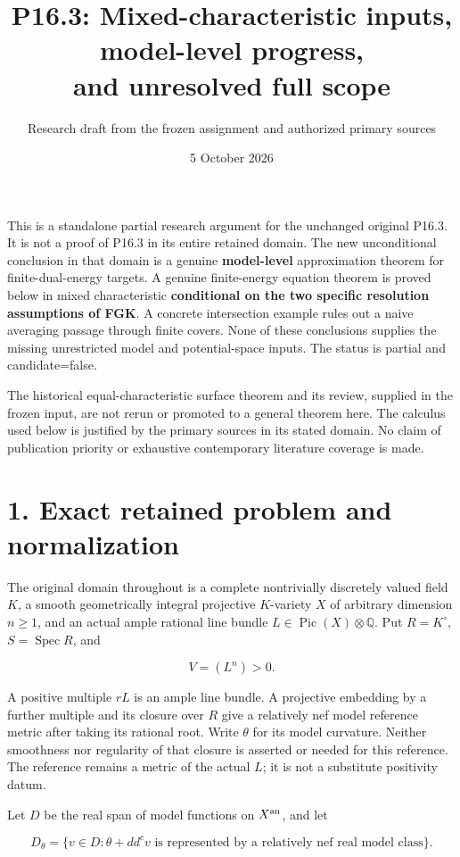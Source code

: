 \documentclass[11pt]{article}
\title{P16.3: Mixed-characteristic inputs, model-level progress,\\and unresolved full scope}
\author{Research draft from the frozen assignment and authorized primary sources}
\date{5 October 2026}
\begin{document}
\maketitle
This is a standalone partial research argument for the unchanged original P16.3. It is not a proof of P16.3 in its entire retained domain. The new unconditional conclusion in that domain is a genuine \textbf{model-level} approximation theorem for finite-dual-energy targets. A genuine finite-energy equation theorem is proved below in mixed characteristic \textbf{conditional on the two specific resolution assumptions of FGK}. A concrete intersection example rules out a naive averaging passage through finite covers. None of these conclusions supplies the missing unrestricted model and potential-space inputs. The status is partial and candidate=false.

The historical equal-characteristic surface theorem and its review, supplied in the frozen input, are not rerun or promoted to a general theorem here. The calculus used below is justified by the primary sources in its stated domain. No claim of publication priority or exhaustive contemporary literature coverage is made.

\section*{1. Exact retained problem and normalization}

The original domain throughout is a complete nontrivially discretely valued field \(K\), a smooth geometrically integral projective \(K\)-variety \(X\) of arbitrary dimension \(n\geq 1\), and an actual ample rational line bundle \(L\in\operatorname{Pic}(X)\otimes\mathbb Q\). Put \(R=K^\circ\), \(S=\operatorname{Spec}R\), and

\[
V=(L^n)>0.
\]

A positive multiple \(rL\) is an ample line bundle. A projective embedding by a further multiple and its closure over \(R\) give a relatively nef model reference metric after taking its rational root. Write \(\theta\) for its model curvature. Neither smoothness nor regularity of that closure is asserted or needed for this reference. The reference remains a metric of the actual \(L\); it is not a substitute positivity datum.

Let \(D\) be the real span of model functions on \(X^{\rm an}\), and let

\[
D_\theta=\{v\in D:\theta+dd^cv\text{ is represented by a relatively nef real model class}\}.
\]
\end{document}

